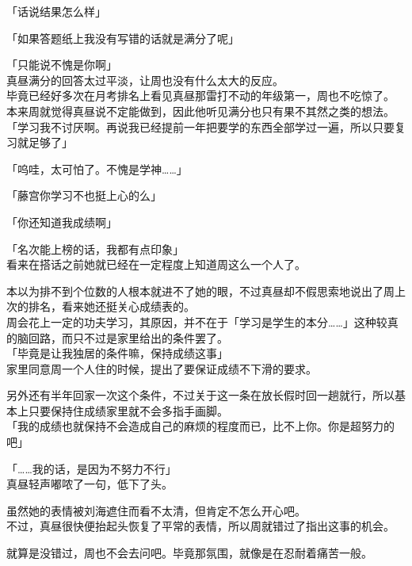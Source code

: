 「话说结果怎么样」

「如果答题纸上我没有写错的话就是满分了呢」

「只能说不愧是你啊」\\

真昼满分的回答太过平淡，让周也没有什么太大的反应。\\

毕竟已经好多次在月考排名上看见真昼那雷打不动的年级第一，周也不吃惊了。\\

本来周就觉得真昼说不定能做到，因此他听见满分也只有果不其然之类的想法。\\

「学习我不讨厌啊。再说我已经提前一年把要学的东西全部学过一遍，所以只要复习就足够了」

「呜哇，太可怕了。不愧是学神……」

「藤宫你学习不也挺上心的么」

「你还知道我成绩啊」

「名次能上榜的话，我都有点印象」\\

看来在搭话之前她就已经在一定程度上知道周这么一个人了。

本以为排不到个位数的人根本就进不了她的眼，不过真昼却不假思索地说出了周上次的排名，看来她还挺关心成绩表的。\\

周会花上一定的功夫学习，其原因，并不在于「学习是学生的本分……」这种较真的脑回路，而只不过是家里给出的条件罢了。\\

「毕竟是让我独居的条件嘛，保持成绩这事」\\

家里同意周一个人住的时候，提出了要保证成绩不下滑的要求。

另外还有半年回家一次这个条件，不过关于这一条在放长假时回一趟就行，所以基本上只要保持住成绩家里就不会多指手画脚。\\

「我的成绩也就保持不会造成自己的麻烦的程度而已，比不上你。你是超努力的吧」

「……我的话，是因为不努力不行」\\

真昼轻声嘟哝了一句，低下了头。

虽然她的表情被刘海遮住而看不太清，但肯定不怎么开心吧。\\

不过，真昼很快便抬起头恢复了平常的表情，所以周就错过了指出这事的机会。

就算是没错过，周也不会去问吧。毕竟那氛围，就像是在忍耐着痛苦一般。\\

